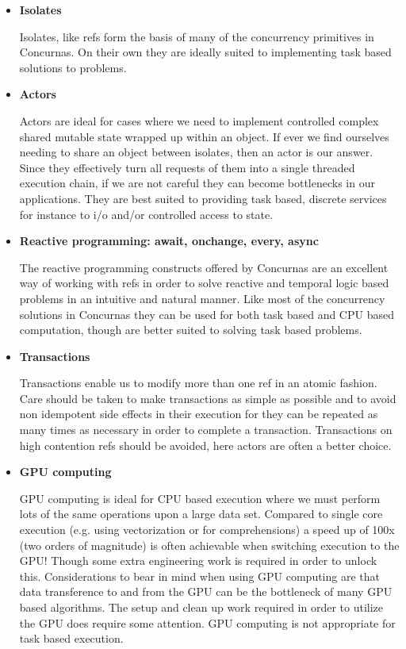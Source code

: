 \documentclass[conc-doc]{subfiles}
\begin{document}
\begin{itemize}
	\item \textbf{Isolates}
	
		Isolates, like refs form the basis of many of the concurrency primitives in Concurnas. On their own they are ideally suited to implementing task based solutions to problems.	
				
	\item \textbf{Actors}
	
		Actors are ideal for cases where we need to implement controlled complex shared mutable state wrapped up within an object. If ever we find ourselves needing to share an object between isolates, then an actor is our answer. Since they effectively turn all requests of them into a single threaded execution chain, if we are not careful they can become bottlenecks in our applications. They are best suited to providing task based, discrete services for instance to i/o and/or controlled access to state.
		
	\item \textbf{Reactive programming: await, onchange, every, async}
	
		The reactive programming constructs offered by Concurnas are an excellent way of working with refs in order to solve reactive and temporal logic based problems in an intuitive and natural manner. Like most of the concurrency solutions in Concurnas they can be used for both task based and CPU based computation, though are better suited to solving task based problems.		
		
	\item \textbf{Transactions}

		Transactions enable us to modify more than one ref in an atomic fashion. Care should be taken to make transactions as simple as possible and to avoid non idempotent side effects in their execution for they can be repeated as many times as necessary in order to complete a transaction. Transactions on high contention refs should be avoided, here actors are often a better choice.
		
	\item \textbf{GPU computing}
	
		GPU computing is ideal for CPU based execution where we must perform lots of the same operations upon a large data set. Compared to single core execution (e.g. using vectorization or for comprehensions) a speed up of 100x (two orders of magnitude) is often achievable when switching execution to the GPU! Though some extra engineering work is required in order to unlock this. Considerations to bear in mind when using GPU computing are that data transference to and from the GPU can be the bottleneck of many GPU based algorithms. The setup and clean up work required in order to utilize the GPU does require some attention. GPU computing is not appropriate for task based execution.
		

\end{itemize}
\end{document}
